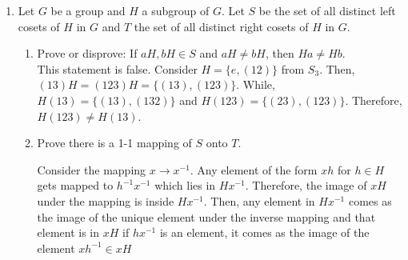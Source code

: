 \documentclass[11pt]{article}
\DeclareMathOperator{\Ker}{Ker}
\begin{document}
\begin{enumerate}
\begin{enumerate}
\begin{proof}
($\Rightarrow$) Let $\phi$ be a monomorphismm that is to say that for $a,b\in G$ such that $\phi(a)=\phi(b)$ that $a=b$ and since $\phi$ is a homomorphism $\phi(e)=e'$. If $g\in \Ker(f),$ then we have that $\phi(g)=e'$. Therefore, $\phi(g)=\phi(e).$ Since $\phi$ is a monomorphism then $g=e$ and then $\Ker(\phi)=\{e\}.$\\
($\Leftarrow$) Let $\Ker(\phi)=\{e\}$. Let $a,b\in G$ such that $\phi(a)=\phi(b)$. Then we have that
\begin{align*}
    \phi(ab^{-1}) &= \phi(a)\phi(b^{-1})\\
    &= \phi(a)\phi(b)^{-1}\\
    &= \phi(a)\phi(a)^{-1}\\
    &= e'.
\end{align*} Thus, the element $ab^{-1}$ is in the $\Ker(\phi)=\{e\}$ and hence $ab^{-1}=e.$ This implies that $a=b$ and that $\phi$ is a monomorphism.
\end{proof}

\end{enumerate}
\pagebreak

\item Let $G$ be a group and $H$ a subgroup of $G$.  
Let $S$ be the set of all distinct left cosets of $H$ in $G$ and 
$T$ the set of all distinct right cosets of $H$ in $G$.
\begin{enumerate}
\item Prove or disprove: If $aH, bH \in S$ and $aH \neq bH$,
then $Ha \neq Hb$.\\

This statement is false. Consider $H=\{e, (12)\}$ from $S_3$. Then, $(13)H=(123)H=\{(13), (123)\}$. While, $H(13)=\{(13),(132)\}$ and $H(123)=\{(23),(123)\}$. Therefore, $H(123)\neq H(13)$.

\item Prove there is a 1-1 mapping of $S$ onto $T$.

Consider the mapping $x\rightarrow x^{-1}$. Any element of the form $xh$ for $h\in H$ gets mapped to $h^{-1}x^{-1}$ which lies in $Hx^{-1}$. Therefore, the image of $xH$ under the mapping is inside $Hx^{-1}$. Then, any element in $Hx^{-1}$ comes as the image of the unique element under the inverse mapping and that element is in $xH$ if $hx^{-1}$ is an element, it comes as the image of the element $xh^{-1}\in xH$

\end{enumerate}

\end{enumerate}
\end{document}
